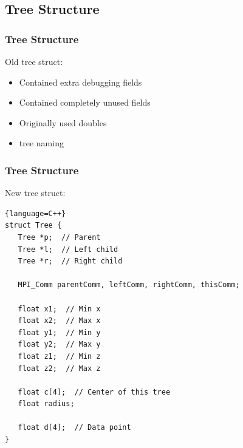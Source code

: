\documentclass[usernames,dvipsnames]{beamer}
\begin{document}
%
%

\subsection{Tree Structure}


\begin{frame}[fragile]
	\frametitle{Tree Structure}
	
    	\begin{block}{Old tree struct:}
    		\begin{itemize}
    			\item Contained extra debugging fields
    			\item Contained completely unused fields
    			\item Originally used doubles
    			\item tree naming
    		\end{itemize}
    	\end{block}
\end{frame}


\begin{frame}[fragile]
	\frametitle{Tree Structure}

\begin{block}{New tree struct:}
\lstset{
   basicstyle=\tiny
}
\begin{lstlisting}{language=C++}
struct Tree {
   Tree *p;  // Parent
   Tree *l;  // Left child
   Tree *r;  // Right child

   MPI_Comm parentComm, leftComm, rightComm, thisComm;

   float x1;  // Min x
   float x2;  // Max x
   float y1;  // Min y
   float y2;  // Max y
   float z1;  // Min z
   float z2;  // Max z

   float c[4];  // Center of this tree
   float radius;

   float d[4];  // Data point
}
\end{lstlisting}
\end{block}
\end{frame}

\end{document}
